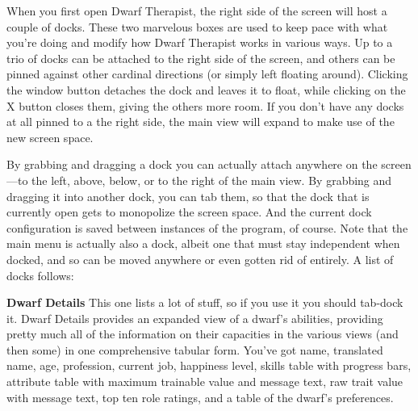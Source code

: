 \documentclass[]{article}
\newcommand{\boldlist}[1] {
\vspace{12pt}
\noindent \textbf{#1}
}
\begin{document}
When you first open Dwarf Therapist, the right side of the screen will host a couple of docks. These two
marvelous boxes are used to keep pace with what you're doing and modify how Dwarf Therapist works in
various ways. Up to a trio of docks can be attached to the right side of the screen, and others can be
pinned against other cardinal directions (or simply left floating around). Clicking the window button
detaches the dock and leaves it to float, while clicking on the X button closes them, giving the others
more room. If you don't have any docks at all pinned to a the right side, the main view will expand to
make use of the new screen space.

By grabbing and dragging a dock you can actually attach anywhere on the screen---to the left, above,
below, or to the right of the main view. By grabbing and dragging it into another dock, you can tab them,
so that the dock that is currently open gets to monopolize the screen space. And the current dock
configuration is saved between instances of the program, of course. Note that the main menu is actually
also a dock, albeit one that must stay independent when docked, and so can be moved anywhere or even
gotten rid of entirely. A list of docks follows:

\boldlist{Dwarf Details} This one lists a lot of stuff, so if you use it you should tab-dock
it. Dwarf Details provides an expanded view of a dwarf's abilities, providing pretty much all of the
information on their capacities in the various views (and then some) in one comprehensive tabular form.
You've got name, translated name, age, profession, current job,  happiness level, skills table with
progress bars, attribute table with maximum trainable value and message text, raw trait value with
message text, top ten role ratings, and a table of the dwarf's preferences.
\end{document}
